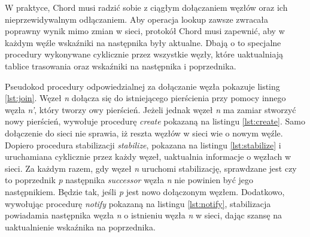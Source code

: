 \documentclass[12pt, twoside, openany]{report}
\begin{document}
W praktyce, Chord musi radzić sobie z ciągłym dołączaniem węzłów oraz ich nieprzewidywalnym odłączaniem. Aby operacja lookup zawsze zwracała poprawny wynik mimo zmian w sieci, protokół Chord musi zapewnić, aby w każdym węźle wskaźniki na następnika były aktualne. Dbają o to specjalne procedury wykonywane cyklicznie przez wszystkie węzły, które uaktualniają tablice trasowania oraz wskaźniki na następnika i poprzednika. 

Pseudokod procedury odpowiedzialnej za dołączanie węzła pokazuje listing \ref{lst:join}. Węzeł \textit{n} dołącza się do istniejącego pierścienia przy pomocy innego węzła \textit{n'}, który tworzy owy pierścień. Jeżeli jednak węzeł \textit{n} ma zamiar stworzyć nowy pierścień, wywołuje procedurę \textit{create} pokazaną na listingu \ref{lst:create}. Samo dołączenie do sieci nie sprawia, iż reszta węzłów w sieci wie o nowym węźle. Dopiero procedura stabilizacji \textit{stabilize}, pokazana na listingu \ref{lst:stabilize} i uruchamiana cyklicznie przez każdy węzeł, uaktualnia informacje o węzłach w sieci. Za każdym razem, gdy węzeł \textit{n} uruchomi stabilizację, sprawdzane jest czy to poprzednik \textit{p} następnika \textit{successor} węzła \textit{n} nie powinien być jego następnikiem. Będzie tak, jeśli \textit{p} jest nowo dołączonym węzłem. Dodatkowo, wywołując procedurę \textit{notify} pokazaną na listingu \ref{lst:notify}, stabilizacja powiadamia następnika węzła \textit{n} o istnieniu węzła \textit{n} w sieci, dając szansę na uaktualnienie wskaźnika na poprzednika.











\end{document}
